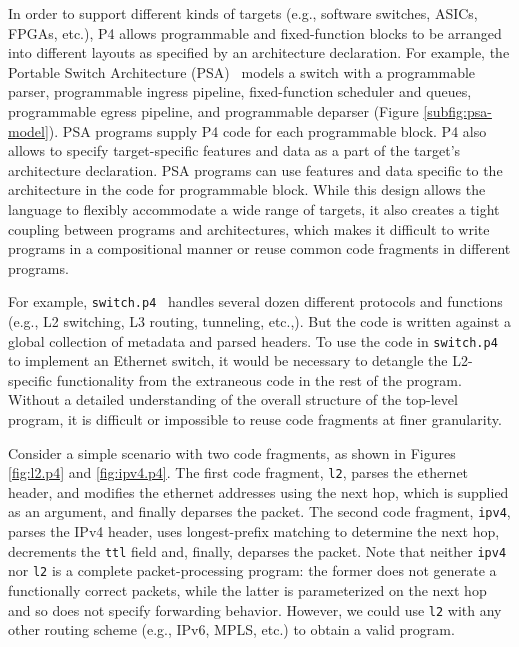 In order to support different kinds of targets (e.g., software
switches, ASICs, FPGAs, etc.), P4 allows programmable and
fixed-function blocks to be arranged into different layouts as
specified by an architecture declaration. For example, the Portable Switch Architecture
(PSA)~\cite{psa} models a switch with a
programmable parser, programmable ingress pipeline, fixed-function
scheduler and queues, programmable egress pipeline, and programmable
deparser (Figure \ref{subfig:psa-model}). 
PSA programs supply P4 code for each programmable block.
P4 also allows to specify target-specific features and data as a part of the target's architecture declaration.
PSA programs can use features and data specific to the architecture in the code for programmable block.
While this design allows the language to flexibly accommodate a
wide range of targets, it also creates a tight coupling between
programs and architectures, which makes it difficult to write programs
in a compositional manner or reuse common code fragments in different
programs.

For example, \texttt{switch.p4}~\cite{switch.p4} handles several dozen
different protocols and functions (e.g., L2 switching, L3 routing,
tunneling, etc.,). But the code is written against a global collection
of metadata and parsed headers. To use the code in 
\texttt{switch.p4} to implement an Ethernet switch, it would be
necessary to detangle the L2-specific functionality from the
extraneous code in the rest of the program. Without a detailed
understanding of the overall structure of the top-level program, it is
difficult or impossible to reuse code fragments at finer granularity.

Consider a simple scenario with two code fragments, as shown in Figures \ref{fig:l2.p4} and \ref{fig:ipv4.p4}.
The first code fragment, \texttt{l2}, parses the ethernet header, and modifies the
ethernet addresses using the next hop, which is supplied as an
argument, and finally deparses the packet. 
The second code fragment, \texttt{ipv4}, parses the IPv4 header, uses
longest-prefix matching to determine the next hop, decrements the
\texttt{ttl} field and, finally, deparses the packet.
Note that neither \texttt{ipv4} nor \texttt{l2} is a complete packet-processing
program: the former does not generate a functionally correct packets,
while the latter is parameterized on the next hop and so does not
specify forwarding behavior. However, we could use \texttt{l2}
with any other routing scheme (e.g., IPv6, MPLS, etc.) to obtain a
valid program.

